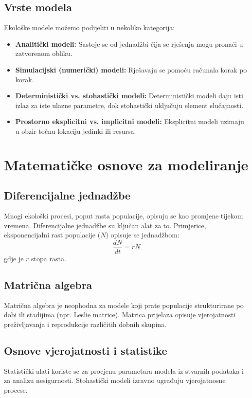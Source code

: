 \documentclass[12pt, a4paper]{book}
\begin{document}
	\section{Vrste modela}
	Ekološke modele možemo podijeliti u nekoliko kategorija:
	\begin{itemize}
		\item \textbf{Analitički modeli:} Sastoje se od jednadžbi čija se rješenja mogu pronaći u zatvorenom obliku.
		\item \textbf{Simulacijski (numerički) modeli:} Rješavaju se pomoću računala korak po korak.
		\item \textbf{Deterministički vs. stohastički modeli:} Deterministički modeli daju isti izlaz za iste ulazne parametre, dok stohastički uključuju element slučajnosti.
		\item \textbf{Prostorno eksplicitni vs. implicitni modeli:} Eksplicitni modeli uzimaju u obzir točnu lokaciju jedinki ili resursa.
	\end{itemize}
	
	\chapter{Matematičke osnove za modeliranje}
	
	\section{Diferencijalne jednadžbe}
	Mnogi ekološki procesi, poput rasta populacije, opisuju se kao promjene tijekom vremena. Diferencijalne jednadžbe su ključan alat za to. Primjerice, eksponencijalni rast populacije ($N$) opisuje se jednadžbom:
	$$ \frac{dN}{dt} = rN $$
	gdje je $r$ stopa rasta.
	
	\section{Matrična algebra}
	Matrična algebra je neophodna za modele koji prate populacije strukturirane po dobi ili stadijima (npr. Leslie matrice). Matrica prijelaza opisuje vjerojatnosti preživljavanja i reprodukcije različitih dobnih skupina.
	
	\section{Osnove vjerojatnosti i statistike}
	Statistički alati koriste se za procjenu parametara modela iz stvarnih podataka i za analizu nesigurnosti. Stohastički modeli izravno ugrađuju vjerojatnosne procese.
	
\end{document}
